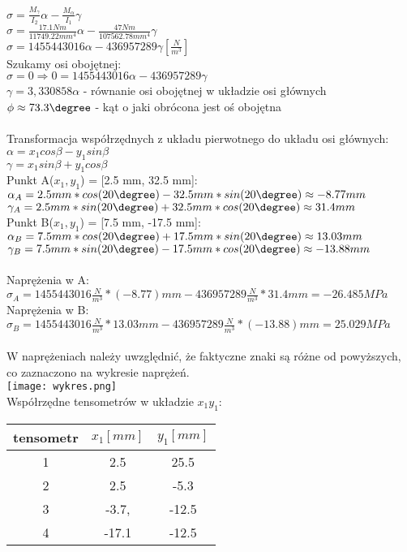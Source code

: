 \documentclass[11pt]{article}
\begin{document}
$\sigma = \frac{M_\gamma}{I_2}\alpha - \frac{M_\alpha}{I_1}\gamma$\\
$\sigma = \frac{17.1 Nm}{11749.22 mm^4}\alpha - \frac{47 Nm}{107562.78 mm^4}\gamma$\\
$\sigma = 1455443016\alpha - 436957289\gamma [\frac{N}{m^3}]$\\
Szukamy osi obojętnej:\\
$\sigma = 0   \Rightarrow   0 = 1455443016\alpha - 436957289\gamma$\\
$\gamma = 3,330858\alpha$  -  równanie osi obojętnej w układzie osi głównych\\
$\phi \approx 73.3\degree$ - kąt o jaki obrócona jest oś obojętna\\
\\
Transformacja współrzędnych z układu pierwotnego do układu osi głównych:\\
$\alpha = x_1cos\beta - y_1sin\beta$\\
$\gamma = x_1sin\beta + y_1cos\beta$\\
Punkt A($x_1,y_1$) = [2.5 mm, 32.5 mm]:\\
$\alpha_A = 2.5 mm * cos(20\degree) - 32.5 mm * sin(20\degree) \approx -8.77 mm$\\
$\gamma_A = 2.5 mm * sin(20\degree) + 32.5 mm * cos(20\degree) \approx 31.4 mm$\\
Punkt B($x_1,y_1$) = [7.5 mm, -17.5 mm]:\\
$\alpha_B = 7.5 mm * cos(20\degree) + 17.5 mm * sin(20\degree) \approx 13.03 mm$\\
$\gamma_B = 7.5 mm * sin(20\degree) - 17.5 mm * cos(20\degree)
\approx -13.88 mm$\\
\\
Naprężenia w A:\\
$\sigma_A = 1455443016 \frac{N}{m^3} * (-8.77) mm - 436957289 \frac{N}{m^3} * 31.4 mm = -26.485 MPa$\\
Naprężenia w B:\\
$\sigma_B = 1455443016 \frac{N}{m^3} * 13.03 mm - 436957289 \frac{N}{m^3} * (-13.88) mm = 25.029 MPa$\\
\\
W naprężeniach należy uwzględnić, że faktyczne znaki są różne od powyższych, co zaznaczono na wykresie naprężeń.\\
\texttt{[image: wykres.png]}\\
Współrzędne tensometrów w układzie $x_1y_1$:\\
\begin{tabular}{c|c|c}
tensometr & $x_1[mm]$ & $y_1[mm]$\\ \hline
1 & 2.5 & 25.5\\
2 & 2.5 & -5.3\\
3 & -3.7, & -12.5\\	
4 & -17.1 & -12.5\\
\end{tabular}\\
\end{document}
